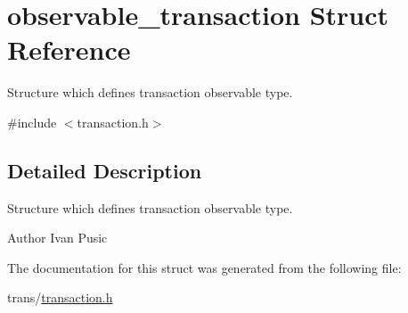 \hypertarget{structobservable__transaction}{}\section{observable\+\_\+transaction Struct Reference}
\label{structobservable__transaction}


Structure which defines transaction observable type.  




{\ttfamily \#include $<$transaction.\+h$>$}



\subsection{Detailed Description}
Structure which defines transaction observable type. 

\begin{DoxyAuthor}{Author}
Ivan Pusic 
\end{DoxyAuthor}


The documentation for this struct was generated from the following file\+:\begin{DoxyCompactItemize}
\item 
trans/\hyperlink{transaction_8h}{transaction.\+h}\end{DoxyCompactItemize}
